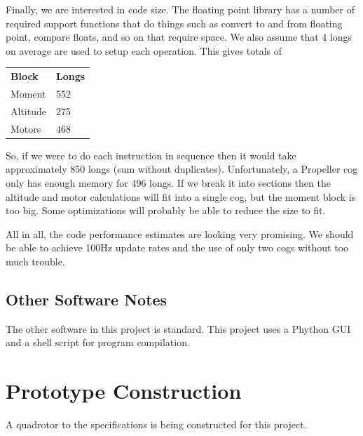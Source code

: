 \documentclass{article}
\numberwithin{equation}{section} %
\begin{document}
Finally, we are interested in code size. The floating point library has a number of required support functions that do things such as convert to and from floating point, compare floats, and so on that require space. We also assume that 4 longs on average are used to setup each operation. This gives totals of
\begin{longtable}{l l}
	\textbf{Block} & \textbf{Longs} \\
	Moment		& 552 \\
	Altitude	& 275 \\
	Motors		& 468 \\
\end{longtable}

So, if we were to do each instruction in sequence then it would take approximately 850 longs (sum without duplicates). Unfortunately, a Propeller cog only has enough memory for 496 longs. If we break it into sections then the altitude and motor calculations will fit into a single cog, but the moment block is too big. Some optimizations will probably be able to reduce the size to fit.

All in all, the code performance estimates are looking very promising. We should be able to achieve 100Hz update rates and the use of only two cogs without too much trouble.

\subsection{Other Software Notes}
The other software in this project is standard. This project uses a Phython GUI and a shell script for program compilation.



  

\section{Prototype Construction}
A quadrotor to the specifications is being constructed for this project.
\end{document}
